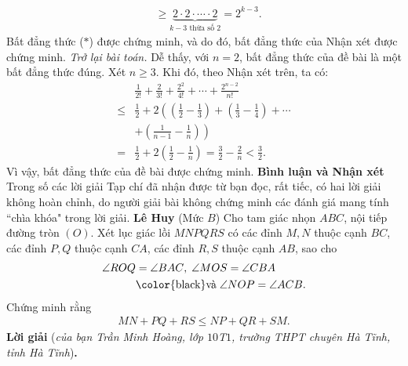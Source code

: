 \begin{multicols}{2}
\begin{align*}
		&\ge \underbrace {2 \cdot 2 \cdot  \cdots  \cdot 2}_{k - 3\text{ thừa số }2} = {2^{k - 3}}.
	\end{align*}
	Bất đẳng thức ($*$) được chứng minh, và do đó, bất đẳng thức của Nhận xét được chứng minh.
	\vskip 0.05cm
	\textit{Trở lại bài toán.}
	\vskip 0.05cm
	Dễ thấy, với $n = 2$, bất đẳng thức của đề bài là một bất đẳng thức đúng.
	\vskip 0.05cm
	Xét $n \ge 3$. Khi đó, theo Nhận xét trên, ta có:
	\begin{align*}
		&\frac{1}{{2!}} + \frac{2}{{3!}} + \frac{{{2^2}}}{{4!}} +  \cdots  + \frac{{{2^{n - 2}}}}{{n!}} \\
		\le &\frac{1}{2} + 2\left( \left( {\frac{1}{2} - \frac{1}{3}} \right) + \left( {\frac{1}{3} - \frac{1}{4}} \right) +  \cdots \right. \\
		&\left.+ \left( {\frac{1}{{n - 1}} - \frac{1}{n}} \right) \right)\\
		= &\frac{1}{2} + 2\left( {\frac{1}{2} - \frac{1}{n}} \right) = \frac{3}{2} - \frac{2}{n} < \frac{3}{2}.
	\end{align*}
	Vì vậy, bất đẳng thức của đề bài được chứng minh.
	\vskip 0.05cm
	\columnbreak
	\textbf{\color{thachthuctoanhoc}Bình luận và Nhận xét}
	\vskip 0.05cm
	Trong số các lời giải Tạp chí đã nhận được từ bạn đọc, rất tiếc, có hai lời giải không hoàn chỉnh, do người giải bài không chứng minh các đánh giá mang tính ``chìa khóa" trong lời giải.
	\vskip 0.1cm
	\hfill	\textbf{\color{thachthuctoanhoc}Lê Huy}
	\vskip 0.1cm
	{}
	(Mức $B$) Cho tam giác nhọn $ABC$, nội tiếp đường tròn $(O)$. Xét lục giác lồi $MNPQRS$ có các đỉnh $M, N$ thuộc cạnh $BC$, các đỉnh $P, Q$ thuộc cạnh $CA$, các đỉnh $R, S$ thuộc cạnh $AB$, sao cho
	\begin{align*}
		\angle{ROQ} &=\angle{BAC},\; \angle{MOS} =\angle{CBA}\;\\
		&\text{\color{black}và}\;\angle{NOP }= \angle{ACB}.
	\end{align*}
	Chứng minh rằng 
	\begin{align*}
		MN + PQ + RS \leq NP + QR + SM.
	\end{align*}
	\textbf{\color{thachthuctoanhoc}Lời giải} (\textit{của bạn Trần Minh Hoàng, lớp $10$T$1$, trường THPT chuyên Hà Tĩnh, tỉnh Hà Tĩnh})\textbf{\color{thachthuctoanhoc}.}
	\begin{figure}[H]
		\centering
		\vspace*{-10pt}
		\captionsetup{labelformat= empty, justification=centering}

\end{figure}
\end{multicols}
